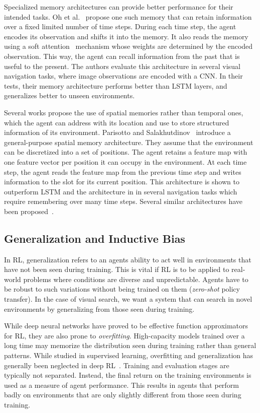 Specialized memory architectures can provide better performance for their intended tasks.
Oh et al.~\cite{oh_control_2016} propose one such memory that can retain information over a fixed limited number of time steps.
During each time step, the agent encodes its observation and shifts it into the memory.
It also reads the memory using a soft attention~\cite{bahdanau_neural_2016} mechanism whose weights are determined by the encoded observation.
This way, the agent can recall information from the past that is useful to the present.
The authors evaluate this architecture in several visual navigation tasks, where image observations are encoded with a CNN.
In their tests, their memory architecture performs better than LSTM layers, and generalizes better to unseen environments.

Several works propose the use of spatial memories rather than temporal ones, which the agent can address with its location and use to store structured information of its environment.
Parisotto and Salakhutdinov~\cite{parisotto_neural_2017} introduce a general-purpose spatial memory architecture.
They assume that the environment can be discretized into a set of positions.
The agent retains a feature map with one feature vector per position it can occupy in the environment.
At each time step, the agent reads the feature map from the previous time step and writes information to the slot for its current position.
This architecture is shown to outperform LSTM and the architecture in \cite{oh_control_2016} in several navigation tasks which require remembering over many time steps. Several similar architectures have been proposed~\cite{henriques_mapnet_2018,gupta_cognitive_2019,chaplot_object_2020}.

\subsection{Generalization and Inductive Bias}

In RL, generalization refers to an agents ability to act well in environments that have not been seen during training.
This is vital if RL is to be applied to real-world problems where conditions are diverse and unpredictable.
Agents have to be robust to such variations without being trained on them (\textit{zero-shot} policy transfer).
In the case of visual search, we want a system that can search in novel environments by generalizing from those seen during training.

While deep neural networks have proved to be effective function approximators for RL, they are also prone to \textit{overfitting}.
High-capacity models trained over a long time may memorize the distribution seen during training rather than general patterns.
While studied in supervised learning, overfitting and generalization has generally been neglected in deep RL~\cite{kirk_survey_2022}.
Training and evaluation stages are typically not separated.
Instead, the final return on the training environments is used as a measure of agent performance.
This results in agents that perform badly on environments that are only slightly different from those seen during training.

